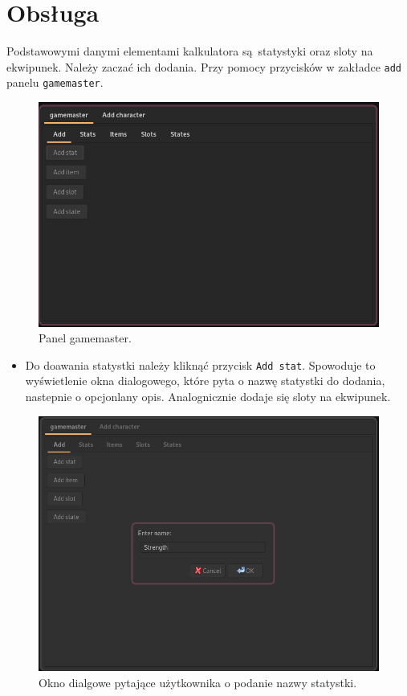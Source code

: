 \documentclass[11pt]{article}
\begin{document}
\section{Obsługa}
\label{sec:org9f37e2d}
Podstawowymi danymi elementami kalkulatora są statystyki oraz sloty na ekwipunek. Należy zaczać ich dodania. Przy pomocy przycisków w zakładce \texttt{add} panelu \texttt{gamemaster}.
\begin{figure}[htbp]
\centering
\includegraphics[width=.9\linewidth]{img/gamemaster.png}
\caption{Panel gamemaster.}
\end{figure}
\begin{itemize}
\item Do doawania statystki należy kliknąć przycisk \texttt{Add stat}. Spowoduje to wyświetlenie okna dialogowego, które pyta o nazwę statystki do dodania, nastepnie o opcjonlany opis. Analognicznie dodaje się sloty na ekwipunek.
\end{itemize}
\begin{figure}[htbp]
\centering
\includegraphics[width=.9\linewidth]{img/statNamePop.png}
\caption{Okno dialgowe pytające użytkownika o podanie nazwy statystki.}
\end{figure}
\end{document}
